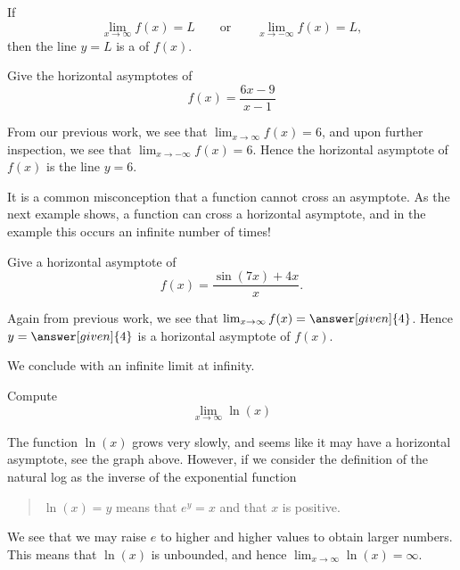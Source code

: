 \documentclass{ximera}
\begin{document}
\begin{definition}\label{def:horiz asymptote}
If  
\[
\lim_{x\to \infty} f(x) = L \qquad\text{or}\qquad \lim_{x\to -\infty} f(x) = L,
\]
then the line $y=L$ is a  of $f(x)$.
\end{definition}

\begin{example} 
Give the horizontal asymptotes of
\[
f(x) = \frac{6x-9}{x-1}
\]
\begin{explanation}
From our previous work, we see that $\lim_{x\to \infty} f(x) = 6$, and
upon further inspection, we see that $\lim_{x\to -\infty} f(x) =
6$. Hence the horizontal asymptote of $f(x)$ is the line $y=6$.
\end{explanation}
\end{example}


It is a common misconception that a function cannot cross an
asymptote. As the next example shows, a function can cross a horizontal
asymptote, and in the example this occurs an infinite number of times!

\begin{example}
Give a horizontal asymptote of
\[
f(x) = \frac{\sin(7x)+4x}{x}.
\]
\begin{explanation}
Again from previous work, we see that $\lim_{x\to \infty} f(x) =
\answer[given]{4}$. Hence $y=\answer[given]{4}$ is a horizontal asymptote of $f(x)$.
\end{explanation}
\end{example}


We conclude with an infinite limit at infinity.

\begin{example}
Compute
\[
\lim_{x\to \infty} \ln(x)
\]
\begin{image}
\end{image}
\begin{explanation}
The function $\ln(x)$ grows very slowly, and seems like it may have a
horizontal asymptote, see the graph above. However, if we consider the
definition of the natural log as the inverse of the exponential
function
\begin{quote}%
  $\ln(x) = y$ means that $e^y =x$ and that $x$ is positive.
\end{quote}
We see that we may raise $e$ to higher and higher values to obtain
larger numbers.  This means that $\ln(x)$ is unbounded, and hence
$\lim_{x\to\infty}\ln(x)=\infty$.
\end{explanation}
\end{example}
\end{document}
